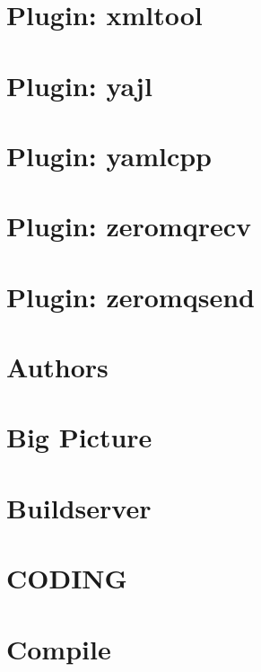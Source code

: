 \let\mypdfximage\pdfximage\def\pdfximage{\immediate\mypdfximage}\documentclass[twoside]{book}
\newcommand{\+}{\discretionary{\mbox{\scriptsize$\hookleftarrow$}}{}{}}
\begin{document}
\chapter{Plugin\+: xmltool}
\label{md_src_plugins_xmltool_README}

\chapter{Plugin\+: yajl}
\label{md_src_plugins_yajl_README}

\chapter{Plugin\+: yamlcpp}
\label{md_src_plugins_yamlcpp_README}

\chapter{Plugin\+: zeromqrecv}
\label{md_src_plugins_zeromqrecv_README}

\chapter{Plugin\+: zeromqsend}
\label{md_src_plugins_zeromqsend_README}

\chapter{Authors}
\label{doc_AUTHORS_md}

\chapter{Big Picture}
\label{doc_BIGPICTURE_md}

\chapter{Buildserver}
\label{doc_BUILDSERVER_md}

\chapter{CODING}
\label{doc_CODING_md}

\chapter{Compile}
\label{doc_COMPILE_md}

\end{document}
